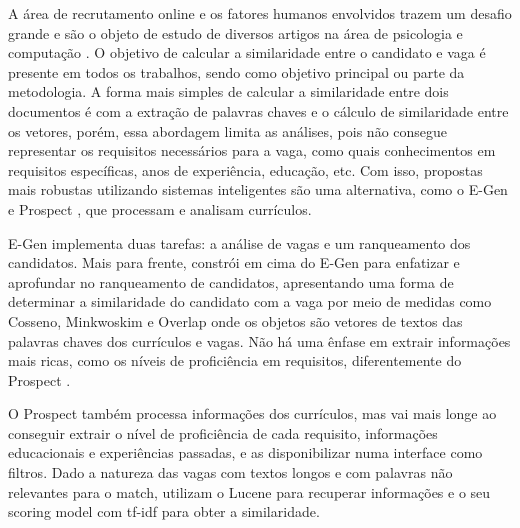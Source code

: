 \documentclass[preprint,12pt]{elsarticle}
\begin{document}
A área de recrutamento online e os fatores humanos envolvidos trazem um desafio grande e são o objeto de estudo de diversos artigos na área de psicologia \cite{Chapman2005ApplicantAT, Hunter1990IndividualDI, Steel1984ARA} e computação \cite{poch-etal-2014-ranking, Singh2010PROSPECTAS, improve-ranking-candidates-2009, e-gen-job-processing-2007, impact-semantic-web-2005, automatic-profiling-2008}. O objetivo de calcular a similaridade entre o candidato e vaga é presente em todos os trabalhos, sendo como objetivo principal ou parte da metodologia. A forma mais simples de calcular a similaridade entre dois documentos é com a extração de palavras chaves e o cálculo de similaridade entre os vetores, porém, essa abordagem limita as análises, pois não consegue representar os requisitos necessários para a vaga, como quais conhecimentos em requisitos específicas, anos de experiência, educação, etc. Com isso, propostas mais robustas utilizando sistemas inteligentes são uma alternativa, como o E-Gen \cite{e-gen-job-processing-2007} e Prospect \cite{Singh2010PROSPECTAS}, que processam e analisam currículos. 
 

E-Gen implementa duas tarefas: a análise de vagas e um ranqueamento dos candidatos. Mais para frente, \cite{improve-ranking-candidates-2009} constrói em cima do E-Gen \cite{e-gen-job-processing-2007} para enfatizar e aprofundar no ranqueamento de candidatos, apresentando uma forma de determinar a similaridade do candidato com a vaga por meio de medidas como Cosseno, Minkwoskim e Overlap onde os objetos são vetores de textos das palavras chaves dos currículos e vagas. Não há uma ênfase em extrair informações mais ricas, como os níveis de proficiência em requisitos, diferentemente do Prospect \cite{Singh2010PROSPECTAS}.


O Prospect \cite{Singh2010PROSPECTAS} também processa informações dos currículos, mas vai mais longe ao conseguir extrair o nível de proficiência de cada requisito, informações educacionais e experiências passadas, e as disponibilizar numa interface como filtros. Dado a natureza das vagas com textos longos e com palavras não relevantes para o match, utilizam o Lucene para recuperar informações e o seu scoring model com tf-idf para obter a similaridade.
\end{document}
